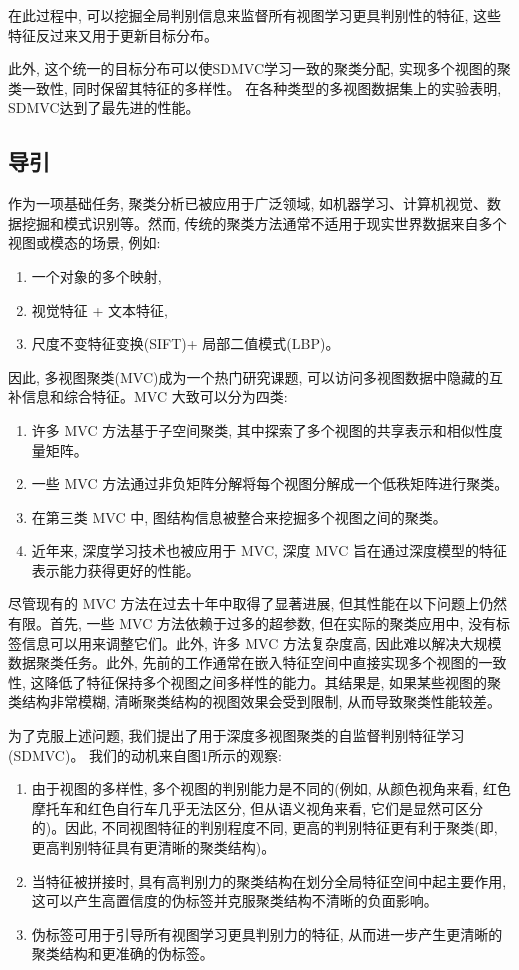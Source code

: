 \documentclass{article}
\begin{document}
在此过程中, 可以挖掘全局判别信息来监督所有视图学习更具判别性的特征, 这些特征反过来又用于更新目标分布。

此外, 这个统一的目标分布可以使SDMVC学习一致的聚类分配, 实现多个视图的聚类一致性, 同时保留其特征的多样性。
在各种类型的多视图数据集上的实验表明, SDMVC达到了最先进的性能。

\subsection{导引}

作为一项基础任务, 聚类分析已被应用于广泛领域, 如机器学习、计算机视觉、数据挖掘和模式识别等。然而, 传统的聚类方法通常不适用于现实世界数据来自多个视图或模态的场景, 例如:
\begin{enumerate}
    \item 一个对象的多个映射,
    \item 视觉特征 + 文本特征,
    \item 尺度不变特征变换(SIFT)+ 局部二值模式(LBP)。
\end{enumerate}
因此, 多视图聚类(MVC)成为一个热门研究课题, 可以访问多视图数据中隐藏的互补信息和综合特征。MVC 大致可以分为四类:
\begin{enumerate}
    \item 许多 MVC 方法基于子空间聚类, 其中探索了多个视图的共享表示和相似性度量矩阵。
    \item 一些 MVC 方法通过非负矩阵分解将每个视图分解成一个低秩矩阵进行聚类。
    \item 在第三类 MVC 中, 图结构信息被整合来挖掘多个视图之间的聚类。
    \item 近年来, 深度学习技术也被应用于 MVC, 深度 MVC 旨在通过深度模型的特征表示能力获得更好的性能。
\end{enumerate}
尽管现有的 MVC 方法在过去十年中取得了显著进展, 但其性能在以下问题上仍然有限。首先, 一些 MVC 方法依赖于过多的超参数, 但在实际的聚类应用中, 没有标签信息可以用来调整它们。此外, 许多 MVC 方法复杂度高, 因此难以解决大规模数据聚类任务。此外, 先前的工作通常在嵌入特征空间中直接实现多个视图的一致性, 这降低了特征保持多个视图之间多样性的能力。其结果是, 如果某些视图的聚类结构非常模糊, 清晰聚类结构的视图效果会受到限制, 从而导致聚类性能较差。

为了克服上述问题, 我们提出了用于深度多视图聚类的自监督判别特征学习(SDMVC)。
我们的动机来自图1所示的观察:
\begin{enumerate}
    \item 由于视图的多样性, 多个视图的判别能力是不同的(例如, 从颜色视角来看, 红色摩托车和红色自行车几乎无法区分, 但从语义视角来看, 它们是显然可区分的)。因此, 不同视图特征的判别程度不同, 更高的判别特征更有利于聚类(即, 更高判别特征具有更清晰的聚类结构)。
    \item 当特征被拼接时, 具有高判别力的聚类结构在划分全局特征空间中起主要作用, 这可以产生高置信度的伪标签并克服聚类结构不清晰的负面影响。
    \item 伪标签可用于引导所有视图学习更具判别力的特征, 从而进一步产生更清晰的聚类结构和更准确的伪标签。
\end{enumerate}
\end{document}

